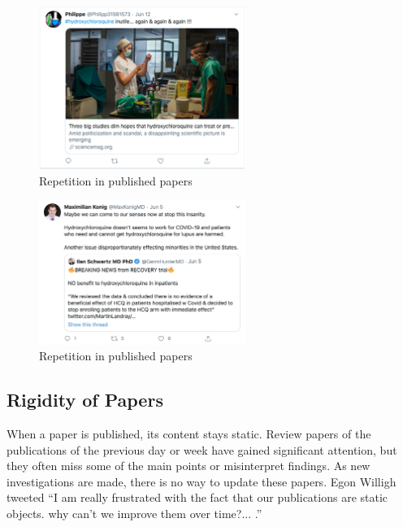 \documentclass[acmsmall,authordraft]{acmart}
\begin{document}
\begin{figure}
  \includegraphics[width=0.6\textwidth]{Pictures/philippe_tweet.png}
  \caption{Repetition in published papers \citep{Philippe2020twitter}}
  \label{philippe_tweet}
\end{figure}

\begin{figure}
  \includegraphics[width=0.6\textwidth]{Pictures/konig tweet.png}
  \caption{Repetition in published papers \citep{Konig2020twitter}}
  \label{konig_tweet}
\end{figure}

\subsection{Rigidity of Papers}
\label{Rigidity_of_Papers}

When a paper is published, its content stays static. 
Review papers of the publications of the previous day or week have gained significant attention, but they often miss some of the main points or misinterpret findings. As new investigations are made, there is no way to update these papers. Egon Willigh tweeted ``I am really frustrated with the fact that our publications are static objects. why can't we improve them over time?... \citep{Will2018twitter}.'' 
\end{document}

